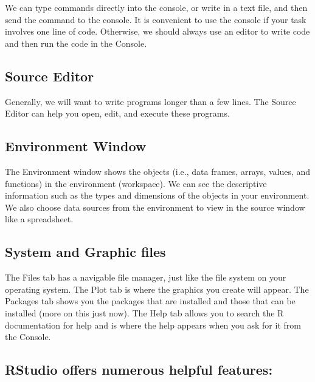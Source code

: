 \documentclass[
]{book}
\begin{document}
We can type commands directly into the console, or write in a text file, and then send the command to the console. It is convenient to use the console if your task involves one line of code. Otherwise, we should always use an editor to write code and then run the code in the Console.

\hypertarget{source-editor}{%
\subsection{Source Editor}\label{source-editor}}

Generally, we will want to write programs longer than a few lines. The Source Editor can help you open, edit, and execute these programs.

\hypertarget{environment-window}{%
\subsection{Environment Window}\label{environment-window}}

The Environment window shows the objects (i.e., data frames, arrays, values, and functions) in the environment (workspace). We can see the descriptive information such as the types and dimensions of the objects in your environment. We also choose data sources from the environment to view in the source window like a spreadsheet.

\hypertarget{system-and-graphic-files}{%
\subsection{System and Graphic files}\label{system-and-graphic-files}}

The Files tab has a navigable file manager, just like the file system on your operating system. The Plot tab is where the graphics you create will appear. The Packages tab shows you the packages that are installed and those that can be installed (more on this just now). The Help tab allows you to search the R documentation for help and is where the help appears when you ask for it from the Console.

\hypertarget{rstudio-offers-numerous-helpful-features}{%
\subsection{RStudio offers numerous helpful features:}\label{rstudio-offers-numerous-helpful-features}}
\end{document}
